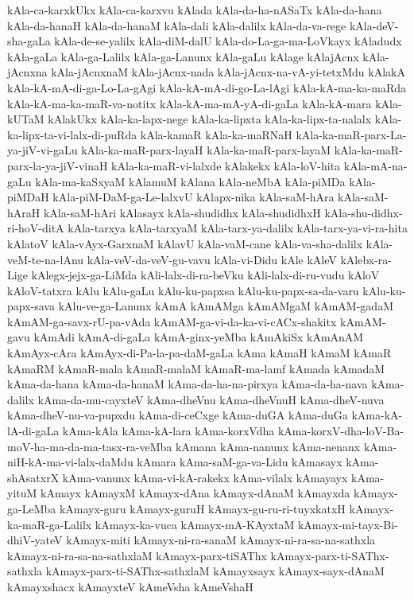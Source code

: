 {kAla-ca-karxkUkx
kAla-ca-karxvu
kAlada
kAla-da-ha-nASaTx
kAla-da-hana
kAla-da-hanaH
kAla-da-hanaM
kAla-dali
kAla-dalilx
kAla-da-va-rege
kAla-deV-sha-gaLa
kAla-de-se-yalilx
kAla-diM-dalU
kAla-do-La-ga-ma-LoVkayx
kAladudx
kAla-gaLa
kAla-ga-Lalilx
kAla-ga-Lanunx
kAla-gaLu
kAlage
kAlajAcnx
kAla-jAcnxna
kAla-jAcnxnaM
kAla-jAcnx-nada
kAla-jAcnx-na-vA-yi-tetxMdu
kAlakA
kAla-kA-mA-di-ga-Lo-La-gAgi
kAla-kA-mA-di-go-La-lAgi
kAla-kA-ma-ka-maRda
kAla-kA-ma-ka-maR-va-notitx
kAla-kA-ma-mA-yA-di-gaLa
kAla-kA-mara
kAla-kUTaM
kAlakUkx
kAla-ka-lapx-nege
kAla-ka-lipxta
kAla-ka-lipx-ta-nalalx
kAla-ka-lipx-ta-vi-lalx-di-puRda
kAla-kamaR
kAla-ka-maRNaH
kAla-ka-maR-parx-La-ya-jiV-vi-gaLu
kAla-ka-maR-parx-layaH
kAla-ka-maR-parx-layaM
kAla-ka-maR-parx-la-ya-jiV-vinaH
kAla-ka-maR-vi-lalxde
kAlakekx
kAla-loV-hita
kAla-mA-na-gaLu
kAla-ma-kaSxyaM
kAlamuM
kAlana
kAla-neMbA
kAla-piMDa
kAla-piMDaH
kAla-piM-DaM-ga-Le-lalxvU
kAlapx-nika
kAla-saM-hAra
kAla-saM-hAraH
kAla-saM-hAri
kAlasayx
kAla-shudidhx
kAla-shudidhxH
kAla-shu-didhx-ri-hoV-ditA
kAla-tarxya
kAla-tarxyaM
kAla-tarx-ya-dalilx
kAla-tarx-ya-vi-ra-hita
kAlatoV
kAla-vAyx-GarxnaM
kAlavU
kAla-vaM-cane
kAla-va-sha-dalilx
kAla-veM-te-na-lAnu
kAla-veV-da-veV-gu-vavu
kAla-vi-Didu
kAle
kAleV
kAlebx-ra-Lige
kAlegx-jejx-ga-LiMda
kAli-lalx-di-ra-beVku
kAli-lalx-di-ru-vudu
kAloV
kAloV-tatxra
kAlu
kAlu-gaLu
kAlu-ku-papxsa
kAlu-ku-papx-sa-da-varu
kAlu-ku-papx-sava
kAlu-ve-ga-Lanunx
kAmA
kAmAMga
kAmAMgaM
kAmAM-gadaM
kAmAM-ga-savx-rU-pa-vAda
kAmAM-ga-vi-da-ka-vi-cACx-shakitx
kAmAM-gavu
kAmAdi
kAmA-di-gaLa
kAmA-ginx-yeMba
kAmAkiSx
kAmAnAM
kAmAyx-cAra
kAmAyx-di-Pa-la-pa-daM-gaLa
kAma
kAmaH
kAmaM
kAmaR
kAmaRM
kAmaR-mala
kAmaR-malaM
kAmaR-ma-lamf
kAmada
kAmadaM
kAma-da-hana
kAma-da-hanaM
kAma-da-ha-na-pirxya
kAma-da-ha-nava
kAma-dalilx
kAma-da-mu-cayxteV
kAma-dheVnu
kAma-dheVnuH
kAma-dheV-nuva
kAma-dheV-nu-va-pupxdu
kAma-di-ceCxge
kAma-duGA
kAma-duGa
kAma-kA-lA-di-gaLa
kAma-kAla
kAma-kA-lara
kAma-korxVdha
kAma-korxV-dha-loV-Ba-moV-ha-ma-da-ma-tasx-ra-veMba
kAmana
kAma-nanunx
kAma-nenanx
kAma-niH-kA-ma-vi-lalx-daMdu
kAmara
kAma-saM-ga-va-Lidu
kAmasayx
kAma-shAsatxrX
kAma-vanunx
kAma-vi-kA-rakekx
kAma-vilalx
kAmayayx
kAma-yituM
kAmayx
kAmayxM
kAmayx-dAna
kAmayx-dAnaM
kAmayxda
kAmayx-ga-LeMba
kAmayx-guru
kAmayx-guruH
kAmayx-gu-ru-ri-tuyxkatxH
kAmayx-ka-maR-ga-Lalilx
kAmayx-ka-vuca
kAmayx-mA-KAyxtaM
kAmayx-mi-tayx-Bi-dhiV-yateV
kAmayx-miti
kAmayx-ni-ra-sanaM
kAmayx-ni-ra-sa-na-sathxla
kAmayx-ni-ra-sa-na-sathxlaM
kAmayx-parx-tiSAThx
kAmayx-parx-ti-SAThx-sathxla
kAmayx-parx-ti-SAThx-sathxlaM
kAmayxsayx
kAmayx-sayx-dAnaM
kAmayxshacx
kAmayxteV
kAmeVsha
kAmeVshaH
}
